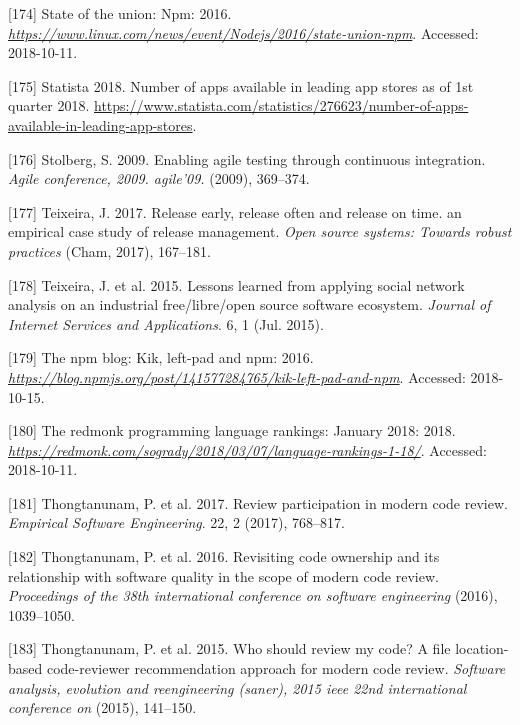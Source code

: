 \documentclass[]{book}
\begin{document}
\hypertarget{ref-Linux2016}{}
{[}174{]} State of the union: Npm: 2016.
\emph{\url{https://www.linux.com/news/event/Nodejs/2016/state-union-npm}}.
Accessed: 2018-10-11.

\hypertarget{ref-appNumber}{}
{[}175{]} Statista 2018. Number of apps available in leading app stores
as of 1st quarter 2018.
\url{https://www.statista.com/statistics/276623/number-of-apps-available-in-leading-app-stores}.

\hypertarget{ref-stolberg2009enabling}{}
{[}176{]} Stolberg, S. 2009. Enabling agile testing through continuous
integration. \emph{Agile conference, 2009. agile'09.} (2009), 369--374.

\hypertarget{ref-teixeira2017a}{}
{[}177{]} Teixeira, J. 2017. Release early, release often and release on
time. an empirical case study of release management. \emph{Open source
systems: Towards robust practices} (Cham, 2017), 167--181.

\hypertarget{ref-Teixeira2015}{}
{[}178{]} Teixeira, J. et al. 2015. Lessons learned from applying social
network analysis on an industrial free/libre/open source software
ecosystem. \emph{Journal of Internet Services and Applications}. 6, 1
(Jul. 2015).

\hypertarget{ref-NPM2016}{}
{[}179{]} The npm blog: Kik, left-pad and npm: 2016.
\emph{\url{https://blog.npmjs.org/post/141577284765/kik-left-pad-and-npm}}.
Accessed: 2018-10-15.

\hypertarget{ref-RedMonk2018}{}
{[}180{]} The redmonk programming language rankings: January 2018: 2018.
\emph{\url{https://redmonk.com/sogrady/2018/03/07/language-rankings-1-18/}}.
Accessed: 2018-10-11.

\hypertarget{ref-thongtanunam2017review}{}
{[}181{]} Thongtanunam, P. et al. 2017. Review participation in modern
code review. \emph{Empirical Software Engineering}. 22, 2 (2017),
768--817.

\hypertarget{ref-thongtanunam2016revisiting}{}
{[}182{]} Thongtanunam, P. et al. 2016. Revisiting code ownership and
its relationship with software quality in the scope of modern code
review. \emph{Proceedings of the 38th international conference on
software engineering} (2016), 1039--1050.

\hypertarget{ref-thongtanunam2015should}{}
{[}183{]} Thongtanunam, P. et al. 2015. Who should review my code? A
file location-based code-reviewer recommendation approach for modern
code review. \emph{Software analysis, evolution and reengineering
(saner), 2015 ieee 22nd international conference on} (2015), 141--150.
\end{document}
